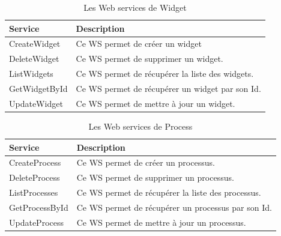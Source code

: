 \begin{table}[H]
    \centering
    \begin{tabular}{|m{5cm}|m{10cm}|}
    \hline
    \textbf{Service} & \textbf{Description} \\
    \hline
    CreateWidget & Ce WS permet de créer un widget \\
    \hline
    DeleteWidget & Ce WS permet de supprimer un widget.\\
    \hline

ListWidgets & Ce WS permet de récupérer la liste des widgets.\\
\hline

GetWidgetById & Ce WS permet de récupérer un widget par son Id.\\
\hline

UpdateWidget & Ce WS permet de mettre à jour un widget.\\

    \hline
    \end{tabular}
    \caption{Les Web services de Widget}
    \label{tab:my_label}
\end{table}














\begin{table}[H]
    \centering
    \begin{tabular}{|m{5cm}|m{10cm}|}
    \hline
    \textbf{Service} & \textbf{Description} \\
    \hline
    CreateProcess & Ce WS permet de créer un processus. \\
    \hline
    DeleteProcess & Ce WS permet de supprimer un processus.\\
    \hline

ListProcesses & Ce WS permet de récupérer la liste des processus.\\
\hline

GetProcessById & Ce WS permet de récupérer un processus par son Id.\\
\hline

UpdateProcess & Ce WS permet de mettre à jour un processus.\\

    \hline
    \end{tabular}
    \caption{Les Web services de Process}
    \label{tab:my_label}
\end{table}






